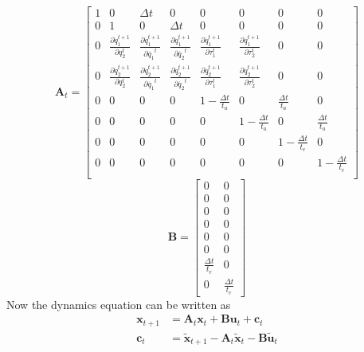 \begin{equation}
	\bm{A}_t = \left[\begin{matrix}
	1 & 0 & \Delta t & 0  & 0 & 0 & 0 & 0 \\
	0 & 1 & 0 &\Delta t   & 0 & 0 & 0 & 0 \\
	0 & \frac{\partial{\dot{q}_1^{t+1}}}{\partial{q_2^t}} & \frac{\partial{\dot{q}_1^{t+1}}}{\partial{\dot{q_1}^t}} & \frac{\partial{\dot{q}_1^{t+1}}}{\partial{\dot{q_2}^t}} & \frac{\partial{\dot{q}_1^{t+1}}}{\partial{\tau_1^t}} & \frac{\partial{\dot{q}_1^{t+1}}}{\partial{\tau_2^t}}& 0& 0 \\
	0 & \frac{\partial{\dot{q}_2^{t+1}}}{\partial{q_2^t}} & \frac{\partial{\dot{q}_2^{t+1}}}{\partial{\dot{q_1}^t}} & \frac{\partial{\dot{q}_2^{t+1}}}{\partial{\dot{q_2}^t}} & \frac{\partial{\dot{q}_2^{t+1}}}{\partial{\tau_1^t}} & \frac{\partial{\dot{q}_2^{t+1}}}{\partial{\tau_2^t}}& 0& 0 \\
	0 & 0 & 0 & 0   &   1-\frac{\Delta t}{t_a} & 0 & \frac{\Delta t}{t_a} & 0 \\
	0 & 0 & 0 & 0   &   0 & 1-\frac{\Delta t}{t_a} & 0 & \frac{\Delta t}{t_a} \\
	0 & 0 & 0 & 0   &   0 & 0 & 1-\frac{\Delta t}{t_e} & 0 \\
	0 & 0 & 0 & 0   &   0 & 0 & 0 & 1-\frac{\Delta t}{t_e} \\
	\end{matrix}\right]
\end{equation}
\begin{equation}
	\bm{B} = \left[\begin{matrix}
	0 & 0 \\
	0 & 0 \\
	0 & 0 \\
	0 & 0 \\
	0 & 0 \\
	0 & 0 \\
	\frac{\Delta t}{t_e} & 0 \\
	0 & \frac{\Delta t}{t_e} 
	\end{matrix}\right]
\end{equation}
Now the dynamics equation can be written as
\begin{equation}\label{dynam}
	\begin{split}
	\bm{x}_{t+1} &= \bm{A}_t \bm{x}_t + \bm{B}\bm{u}_t + \bm{c}_t \\
	\bm{c}_t &= \tilde{\bm{x}}_{t+1} - \bm{A}_t\tilde{\bm{x}}_{t} - \bm{B}\tilde{\bm{u}}_t
	\end{split}
\end{equation}

